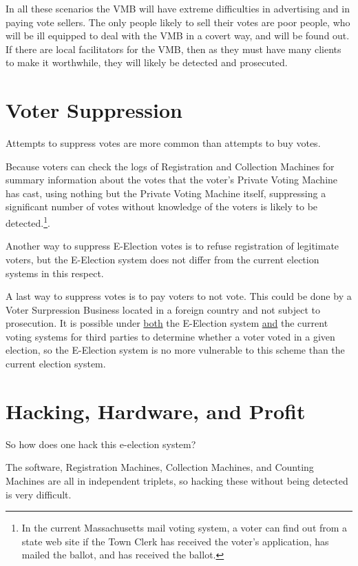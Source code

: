 \documentclass[12pt]{article}
\begin{document}
In all these scenarios the VMB will have extreme difficulties in
advertising and in paying vote sellers.
The only people likely to sell their votes are poor people,
who will be ill equipped to deal with the VMB in a covert way, and
will be found out.
If there are local facilitators for the VMB, then
as they must have many clients to
make it worthwhile, they will likely be detected and prosecuted.%


\section{Voter Suppression}

Attempts to suppress votes are more common than attempts to buy votes.

Because voters can check the logs of Registration and Collection Machines
for summary information about the votes that the voter's Private Voting Machine
has cast, using nothing but the Private Voting Machine itself,
suppressing a significant number of votes without knowledge of
the voters is likely
to be detected.\footnote{In the current Massachusetts mail voting
system, a voter can find out from a state web site if the Town Clerk
has received the voter's application, has mailed the ballot, and has
received the ballot.}.

Another way to suppress E-Election votes is to refuse registration
of legitimate voters, but the E-Election system does not differ
from the current election systems in this respect.

A last way to suppress votes is to pay voters to not vote.  This
could be done by a Voter Surpression Business located in a foreign
country and not subject to prosecution.  It is possible under \underline{both}
the E-Election system \underline{and} the current voting systems
for third parties to determine whether a voter voted in a given
election, so the E-Election system is no more vulnerable to this
scheme than the current election system.

\section{Hacking, Hardware, and Profit}

So how does one hack this e-election system?

The software, Registration Machines, Collection Machines,
and Counting Machines are all in independent triplets, so
hacking these without being detected is very difficult.
\end{document}
